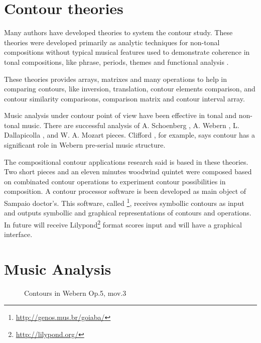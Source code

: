 \section{Contour theories}
\label{sec:contour-theories}

Many authors
\cite{friedmann85:methodology,friedmann87:response,morris87:composition,morris93:directions,marvin.ea87:relating,marvin88:generalized,marvin.ea95:generalization,polansky.ea92:possible,quinn97:fuzzy,clifford95:contour,beard03:contour}
have developed theories to system the contour study. These theories
were developed primarily as analytic techniques for non-tonal
compositions without typical musical features used to demonstrate
coherence in tonal compositions, like phrase, periods, themes and
functional analysis \cite{beard03:contour}.

These theories provides arrays, matrixes and many operations to help
in comparing contours, like inversion, translation, contour elements
comparison, and contour similarity comparisons, comparison matrix and
contour interval array.

Music analysis under contour point of view have been effective in
tonal and non-tonal music. There are successful analysis of A.
Schoenberg \cite{friedmann85:methodology}, A. Webern
\cite{clifford95:contour}, L. Dallapicolla
\cite{marvin88:generalized}, and W. A. Mozart \cite{beard03:contour}
pieces. Clifford \cite{clifford95:contour}, for example, says contour
has a significant role in Webern pre-serial music structure.

The compositional contour applications research said is based in these
theories. Two short pieces and an eleven minutes woodwind quintet were
composed based on combinated contour operations to experiment contour
possibilities in composition. A contour processor software is been
developed as main object of Sampaio doctor's. This software, called
\goiaba{}\footnote{\url{http://genos.mus.br/goiaba/}}, receives
symbollic contours as input and outputs symbollic and graphical
representations of contours and operations. In future \goiaba{} will
receive Lilypond\footnote{\url{http://lilypond.org/}} format scores
input and will have a graphical interface.

\section{Music Analysis}
\label{sec:music-analysis}

\begin{figure}[!p]
  \centering

  \quad
  \caption{Contours in Webern Op.5, mov.3}
  \label{fig:exemplos-webern}
\end{figure}


